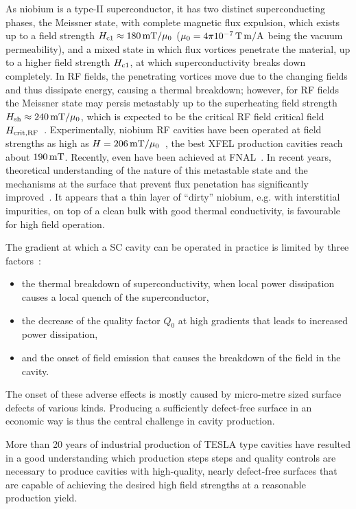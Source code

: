 As niobium is a type-II superconductor, it has two distinct superconducting phases, the Meissner state, with complete magnetic flux expulsion, which exists up to a field strength $H_{\mathrm{c1}} \approx 180\,{\mathrm{mT}}/\mu_0$ ($\mu_0 = 4\pi 10^{-7}\,{\mathrm{T\,m/A}}$ being the vacuum permeability), and a mixed state in which flux vortices penetrate the material, up to a higher field strength $H_{\mathrm{c1}}$, at which superconductivity breaks down completely.
In RF fields, the penetrating vortices move due to the changing fields and thus dissipate energy, causing a thermal breakdown; 
however, for RF fields the Meissner state may persis metastably up to the superheating field strength $H_{\mathrm{sh}} \approx 240\,{\mathrm{mT}}/\mu_0$, which is expected to be the critical RF field critical field $H_{\mathrm{crit,RF}}$~\cite{Padamsee:1998vf}.
Experimentally, niobium RF cavities have been operated at field strengths as high as $H=206\,{\mathrm{mT}}/\mu_0$~\cite{Eremeev:2007zza}, the best XFEL production cavities reach about $190\,{\mathrm{mT}}$.
Recently, even  have been achieved at FNAL~\cite{Grassellino:2018tqg}.
In recent years, theoretical understanding of the nature of this metastable state and the mechanisms at the surface that prevent flux penetation has significantly improved~\cite{Gurevich:2017vnn,Kubo:2017cww}.
It appears that a thin layer of ``dirty'' niobium, e.g. with interstitial impurities, on top of a clean bulk with good thermal conductivity, is favourable for high field operation.  

The gradient at which a SC cavity can be operated in practice is limited by three factors~\cite{Padamsee:1998vf}:
\begin{itemize}
\item the thermal breakdown of superconductivity, when local power dissipation causes a local quench of the superconductor,
\item the decrease of the quality factor $Q_0$ at high gradients that leads to increased power dissipation,
\item and the onset of field emission that causes the breakdown of the field in the cavity.
\end{itemize}
The onset of these adverse effects is mostly caused by micro-metre sized surface defects of various kinds. 
Producing a sufficiently defect-free surface in an economic way is thus the central challenge in cavity production.

More than 20 years of industrial production of TESLA type cavities have resulted in a good understanding which production steps steps and quality controls are necessary to produce cavities with high-quality, nearly defect-free surfaces that are capable of achieving the desired high field strengths at a reasonable production yield.


